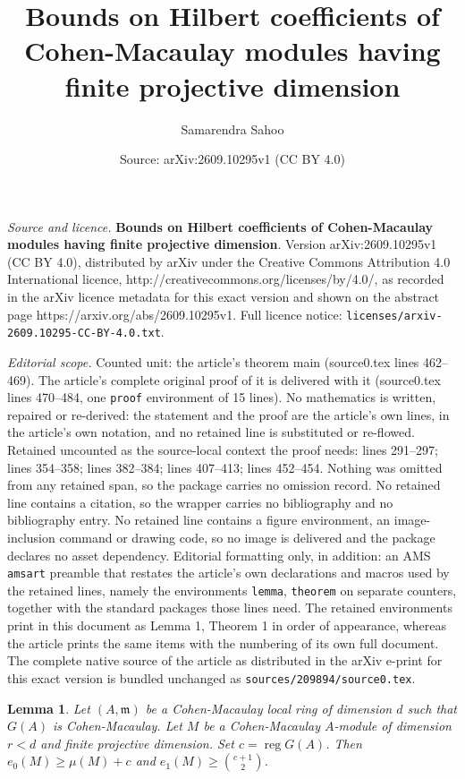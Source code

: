 \documentclass[10pt,a4paper]{amsart}
\title{\large \textbf{Bounds on Hilbert coefficients of Cohen-Macaulay modules having finite projective dimension}}
\author{Samarendra Sahoo}
\date{Source: arXiv:2609.10295v1 (CC BY 4.0)}
\newtheorem{lemma}{Lemma}
\begin{document}
\maketitle

\noindent\emph{Source and licence.} \large \textbf{Bounds on Hilbert coefficients of Cohen-Macaulay modules having finite projective dimension}. Version arXiv:2609.10295v1 (CC BY 4.0), distributed by arXiv under the Creative Commons Attribution 4.0 International licence, http://creativecommons.org/licenses/by/4.0/, as recorded in the arXiv licence metadata for this exact version and shown on the abstract page https://arxiv.org/abs/2609.10295v1. Full licence notice: \texttt{licenses/arxiv-2609.10295-CC-BY-4.0.txt}.\par\smallskip

\noindent\textit{Editorial scope.} Counted unit: the article's theorem main (source0.tex lines 462--469). The article's complete original proof of it is delivered with it (source0.tex lines 470--484, one \texttt{proof} environment of 15 lines). No mathematics is written, repaired or re-derived: the statement and the proof are the article's own lines, in the article's own notation, and no retained line is substituted or re-flowed.  Retained uncounted as the source-local context the proof needs: lines 291--297; lines 354--358; lines 382--384; lines 407--413; lines 452--454.  Nothing was omitted from any retained span, so the package carries no omission record.  No retained line contains a citation, so the wrapper carries no bibliography and no bibliography entry.  No retained line contains a figure environment, an image-inclusion command or drawing code, so no image is delivered and the package declares no asset dependency.  Editorial formatting only, in addition: an AMS \texttt{amsart} preamble that restates the article's own declarations and macros used by the retained lines, namely the environments \texttt{lemma}, \texttt{theorem} on separate counters, together with the standard packages those lines need.  The retained environments print in this document as Lemma 1, Theorem 1 in order of appearance, whereas the article prints the same items with the numbering of its own full document.  The complete native source of the article as distributed in the arXiv e-print for this exact version is bundled unchanged as \texttt{sources/209894/source0.tex}.
\begin{lemma}
\label{lowerbound}
Let $(A,\mathfrak{m})$ be a Cohen-Macaulay local ring of dimension $d$ such that $G(A)$ is Cohen-Macaulay. Let $M$ be a Cohen-Macaulay $A$-module of dimension
$r<d$ and finite projective dimension. Set
$c=\operatorname{reg} G(A)$. Then
$e_0(M)\geq\mu(M)+c$ and $e_1(M)\geq\binom{c+1}{2}$.
\end{lemma}
\end{document}

